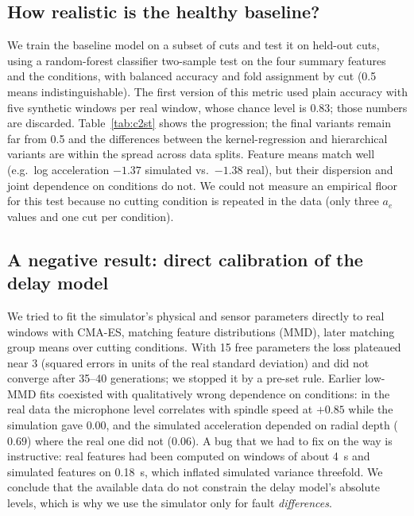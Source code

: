 \documentclass[11pt]{article}
\newcommand{\verify}[1]{{\color{blue}[\textbf{VERIFY:} #1]}}
\begin{document}
\subsection{How realistic is the healthy baseline?}
We train the baseline model on a subset of cuts and test it on held-out cuts, using a random-forest classifier two-sample test on the four summary features and the conditions, with balanced accuracy and fold assignment by cut (0.5 means indistinguishable).
The first version of this metric used plain accuracy with five synthetic windows per real window, whose chance level is 0.83; those numbers are discarded.
Table~\ref{tab:c2st} shows the progression; the final variants remain far from 0.5 and the differences between the kernel-regression and hierarchical variants are within the spread across data splits.
Feature means match well (e.g.\ log acceleration $-1.37$ simulated vs.\ $-1.38$ real), but their dispersion and joint dependence on conditions do not.
We could not measure an empirical floor for this test because no cutting condition is repeated in the data (only three $a_e$ values and one cut per condition).
\begin{table}[t]\centering\small

\caption{Classifier two-sample test between real and simulated healthy windows on held-out cuts. Three-split values are mean $\pm$ standard deviation over random stratified splits. \verify{values copied from console logs; only the last run is archived}}\label{tab:c2st}
\end{table}

\subsection{A negative result: direct calibration of the delay model}\label{sec:neg}
We tried to fit the simulator's physical and sensor parameters directly to real windows with CMA-ES, matching feature distributions (MMD), later matching group means over cutting conditions.
With 15 free parameters the loss plateaued near 3 (squared errors in units of the real standard deviation) and did not converge after 35--40 generations; we stopped it by a pre-set rule.
Earlier low-MMD fits coexisted with qualitatively wrong dependence on conditions: in the real data the microphone level correlates with spindle speed at $+0.85$ while the simulation gave $0.00$, and the simulated acceleration depended on radial depth ($0.69$) where the real one did not ($0.06$).
A bug that we had to fix on the way is instructive: real features had been computed on windows of about 4~s and simulated features on 0.18~s, which inflated simulated variance threefold.
We conclude that the available data do not constrain the delay model's absolute levels, which is why we use the simulator only for fault \emph{differences}.
\end{document}
